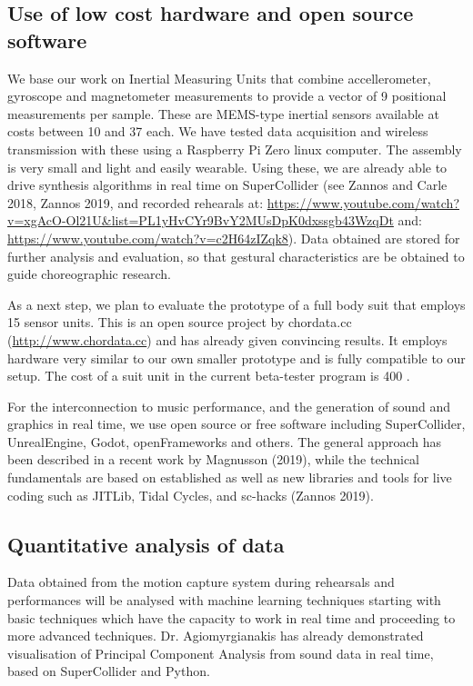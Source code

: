 \subsection{Use of low cost hardware and open source software}
\label{sec:org573993f}
We base our work on Inertial Measuring Units that combine accellerometer, gyroscope and magnetometer measurements to provide a vector of 9 positional measurements per sample. These are MEMS-type inertial sensors available at costs between 10 and 37 \texteuro{} each.  We have tested data acquisition and wireless transmission with these using a Raspberry Pi Zero linux computer. The assembly is very small and light and easily wearable.  Using these, we are already able to drive synthesis algorithms in real time on SuperCollider (see Zannos and Carle 2018, Zannos 2019, and recorded rehearals at: \url{https://www.youtube.com/watch?v=xgAcO-Ol21U\&list=PL1yHvCYr9BvY2MUsDpK0dxssgb43WzqDt} and: \url{https://www.youtube.com/watch?v=c2H64zIZqk8}).  Data obtained are stored for further analysis and evaluation, so that gestural characteristics are be obtained to guide choreographic research.

As a next step, we plan to evaluate the prototype of a full body suit that employs 15 sensor units.  This is an open source project by chordata.cc (\url{http://www.chordata.cc}) and has already given convincing results.  It employs hardware very similar to our own smaller prototype and is fully compatible to our setup.  The cost of a suit unit in the current beta-tester program is 400 \texteuro{}. 

For the interconnection to music performance, and the generation of sound and graphics in real time, we use open source or free software including SuperCollider, UnrealEngine, Godot, openFrameworks and others.  The general approach has been described in a recent work by Magnusson (2019), while the technical fundamentals are based on established as well as new libraries and tools for live coding such as JITLib, Tidal Cycles, and sc-hacks (Zannos 2019). 

\subsection{Quantitative analysis of data}
\label{sec:orgc1e55aa}
Data obtained from the motion capture system during rehearsals and performances will be analysed with machine learning techniques starting with basic techniques which have the capacity to work in real time and proceeding to more advanced techniques.  Dr. Agiomyrgianakis has already demonstrated visualisation of Principal Component Analysis from sound data in real time, based on SuperCollider and Python. 

